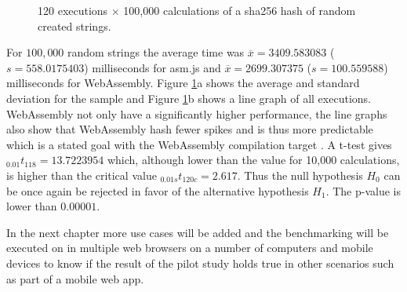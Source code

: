 \begin{figure}[!h]%
\centering
{}%
{}%
\caption{120 executions $\times$ 100,000 calculations of a sha256 hash of random created strings.}%
\label{sha256-hash-100000-1}%
\end{figure}

For $100,000$ random strings the average time was $\overline{x}=3409.583083$ ($s=558.0175403$) milliseconds for asm.js and $\overline{x}=2699.307375$ ($s=100.559588$) milliseconds for WebAssembly. Figure \ref{sha256-hash-100000-1}a shows the average and standard deviation for the sample and Figure \ref{sha256-hash-100000-1}b shows a line graph of all executions. WebAssembly not only have a significantly higher performance, the line graphs also show that WebAssembly hash fewer spikes and is thus more predictable which is a stated goal with the WebAssembly compilation target \parencite{HaasRossbergSchuffTitzerHolmanGohmanWagnerZakaiBastien2017}. A t-test gives $_{0.01}t_{118}=13.7223954$ which, although lower than the value for 10,000 calculations, is higher than the critical value $_{0.01s}t_{120c}=2.617$. Thus the null hypothesis $H_{0}$ can be once again be rejected in favor of the alternative hypothesis $H_{1}$. The p-value is lower than $0.00001$.

In the next chapter more use cases will be added and the benchmarking will be executed on in multiple web browsers on a number of computers and mobile devices to know if the result of the pilot study holds true in other scenarios such as part of a mobile web app.

\clearpage


